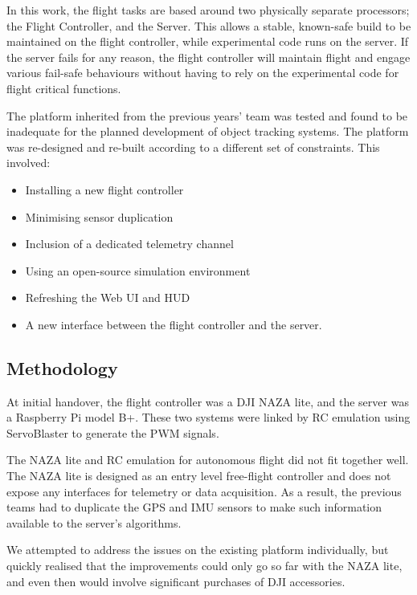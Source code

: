 \documentclass{article}
\begin{document}
      In this work, the flight tasks are based around two physically separate processors; the Flight Controller, and the Server. This allows a stable, known-safe build to be maintained on the flight controller, while experimental code runs on the server. If the server fails for any reason, the flight controller will maintain flight and engage various fail-safe behaviours without having to rely on the experimental code for flight critical functions.

      The platform inherited from the previous years' team was tested and found to be inadequate for the planned development of object tracking systems.  The platform was re-designed and re-built according to a different set of constraints.  This involved:

      \begin{itemize}
        \item Installing a new flight controller
        \item Minimising sensor duplication
        \item Inclusion of a dedicated telemetry channel
        \item Using an open-source simulation environment
        \item Refreshing the Web UI and HUD
        \item A new interface between the flight controller and the server.
      \end{itemize}


    \subsection{Methodology}
      At initial handover, the flight controller was a DJI NAZA lite, and the server was a Raspberry Pi model B+.  These two systems were linked by RC emulation using ServoBlaster to generate the PWM signals.

      The NAZA lite and RC emulation for autonomous flight did not fit together well. The NAZA lite is designed as an entry level free-flight controller and does not expose any interfaces for telemetry or data acquisition.  As a result, the previous teams had to duplicate the GPS and IMU sensors to make such information available to the server's algorithms.

      We attempted to address the issues on the existing platform individually, but quickly realised that the improvements could only go so far with the NAZA lite, and even then would involve significant purchases of DJI accessories.
\end{document}
